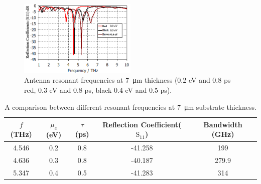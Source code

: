 \documentclass[12pt]{suhbook}
\begin{document}
% 
\begin{figure}[h]
\centering
\includegraphics[width=0.5\textwidth]{5}
\caption{Antenna resonant frequencies at \SI{7}{\um} thickness (0.2 eV and 0.8 ps red, 0.3 eV and 0.8 ps, black 0.4 eV and 0.5 ps).}
\label{Fig 5}
\end{figure}
% 
\begin{table}[hbt!]
\centering
 \begin{tabular}[hbt!]{|c | c |c |c|c|} 
 \hline
 $f$ (THz) & $\mu_c$ (eV) & $\tau$ (ps) & Reflection Coefficient($\mathrm{S_{11}}$) & Bandwidth (GHz) \\ [0.5ex] 
 \hline
4.546 & 0.2  & 0.8  &  -41.258 & 199 \\
 \hline
4.636  & 0.3  & 0.8  & -40.187  & 279.9 \\
 \hline
 5.347 & 0.4  & 0.5 & -41.283 & 314  \\[1ex]
 \hline
\end{tabular}
\caption{A comparison between different resonant frequencies at \SI{7}{\um} substrate thickness.}
\label{table:3}
\end{table}
% 
% 
\end{document}

